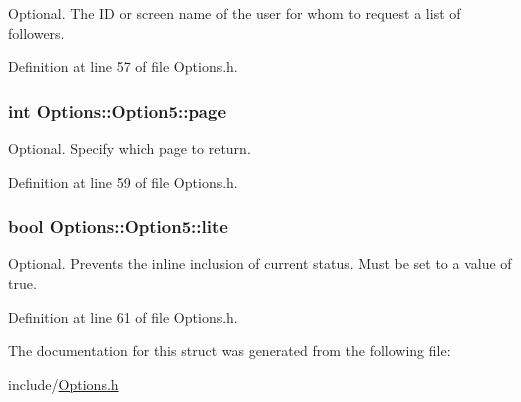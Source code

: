 Optional. The ID or screen name of the user for whom to request a list of followers. 



Definition at line 57 of file Options.h.\hypertarget{structOptions_1_1Option5_9a0ff1b77d61ebe305785b966f575443}{
\subsubsection{\setlength{\rightskip}{0pt plus 5cm}int {\bf Options::Option5::page}}}
\label{structOptions_1_1Option5_9a0ff1b77d61ebe305785b966f575443}


Optional. Specify which page to return. 



Definition at line 59 of file Options.h.\hypertarget{structOptions_1_1Option5_5df7cf9115786b7e47f955d54ea0aae5}{
\subsubsection{\setlength{\rightskip}{0pt plus 5cm}bool {\bf Options::Option5::lite}}}
\label{structOptions_1_1Option5_5df7cf9115786b7e47f955d54ea0aae5}


Optional. Prevents the inline inclusion of current status. Must be set to a value of true. 



Definition at line 61 of file Options.h.

The documentation for this struct was generated from the following file:\begin{CompactItemize}
\item 
include/\hyperlink{Options_8h}{Options.h}\end{CompactItemize}
